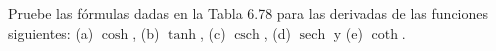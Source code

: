 \item Pruebe las fórmulas dadas en la Tabla 6.78 para las derivadas de las funciones siguientes: (a) $\cosh$, (b) $\tanh$, (c) $\operatorname{csch}$, (d) $\operatorname{sech}$ y (e) $\coth$.
